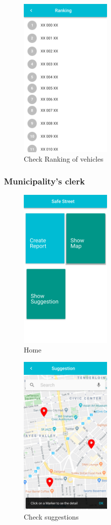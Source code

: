\documentclass{article}
\begin{document}
\begin{figure}[!htb]
		\centering
		\includegraphics[height=7.9cm,keepaspectratio]{images/mockups/Ranking.png}
		\caption{Check Ranking of vehicles}
\end{figure}

\clearpage
\subsubsection{Municipality's clerk}
\begin{figure}[!htb]
		\centering
		\includegraphics[height=7.9cm,keepaspectratio]{images/mockups/Home_Municipality.png}
		\caption{Home}
\end{figure}

\begin{figure}[!htb]
		\centering
		\includegraphics[height=7.9cm,keepaspectratio]{images/mockups/Suggestions.png}
		\caption{Check suggestions}
\end{figure}
\end{document}
